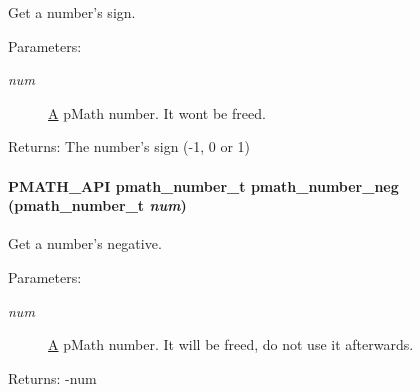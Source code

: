 Get a number's sign. 

\begin{Desc}
\item[Parameters:]
\begin{description}
\item[{\em num}]\hyperlink{class_a}{A} pMath number. It wont be freed. \end{description}
\end{Desc}
\begin{Desc}
\item[Returns:]The number's sign (-1, 0 or 1) \end{Desc}
\hypertarget{group__numbers_gfbfb5ee7f7cd966432e1cee6fa5b6bf5}{
\paragraph[{pmath\_\-number\_\-neg}]{\setlength{\rightskip}{0pt plus 5cm}PMATH\_\-API {\bf pmath\_\-number\_\-t} pmath\_\-number\_\-neg ({\bf pmath\_\-number\_\-t} {\em num})}\hfill}
\label{group__numbers_gfbfb5ee7f7cd966432e1cee6fa5b6bf5}


Get a number's negative. 

\begin{Desc}
\item[Parameters:]
\begin{description}
\item[{\em num}]\hyperlink{class_a}{A} pMath number. It will be freed, do not use it afterwards. \end{description}
\end{Desc}
\begin{Desc}
\item[Returns:]-num \end{Desc}
